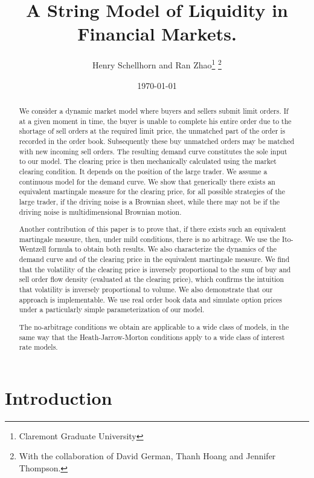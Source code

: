 \documentclass{article}
\begin{document}
\title{A String Model of Liquidity in Financial Markets.}
\author{Henry Schellhorn and Ran Zhao\thanks{%
Claremont Graduate University} \thanks{%
With the collaboration of David German, Thanh Hoang and Jennifer Thompson.}}
\date{\today }
\maketitle

\begin{abstract}
We consider a dynamic market model where buyers and sellers submit limit
orders. If at a given moment in time, the buyer is unable to complete his
entire order due to the shortage of sell orders at the required limit price,
the unmatched part of the order is recorded in the order book. Subsequently
these buy unmatched orders may be matched with new incoming sell orders. The
resulting demand curve constitutes the sole input to our model. The clearing
price is then mechanically calculated using the market clearing condition.
It depends on the position of the large trader. We assume a continuous model
for the demand curve. We show that generically there exists an equivalent
martingale measure for the clearing price, for all possible strategies of
the large trader, if the driving noise is a Brownian sheet, while there may
not be if the driving noise is multidimensional Brownian motion.

Another contribution of this paper is to prove that, if there exists such an
equivalent martingale measure, then, under mild conditions, there is no
arbitrage. We use the Ito-Wentzell formula to obtain both results. We also
characterize the dynamics of the demand curve and of the clearing price in
the equivalent martingale measure. We find that the volatility of the
clearing price is inversely proportional to the sum of buy and sell order
flow density (evaluated at the clearing price), which confirms the intuition
that volatility is inversely proportional to volume. We also demonstrate
that our approach is implementable. We use real order book data and simulate
option prices under a particularly simple parameterization of our model.

The no-arbitrage conditions we obtain are applicable to a wide class of
models, in the same way that the Heath-Jarrow-Morton conditions apply to a
wide class of interest rate models.
\end{abstract}

\section{Introduction}
\end{document}
